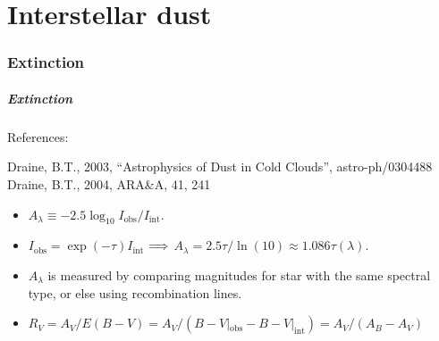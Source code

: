 
\addtocounter{part}{3}

\part{Interstellar dust}
\begin{frame}
  \partpage
  \tableofcontents[part=4]
\end{frame}

\section{Extinction}

\begin{frame}\frametitle{Extinction}


References: 

Draine, B.T., 2003, ``Astrophysics of Dust in Cold Clouds'',
astro-ph/0304488
Draine, B.T., 2004, ARA\&A, 41, 241


\begin{itemize}

\item $A_\lambda \equiv -2.5 \log_{10} I_\mathrm{obs} /
I_\mathrm{int}$. 

\item $I_\mathrm{obs} = \exp(-\tau)  I_\mathrm{int}$
${\bf \Longrightarrow}$ $A_\lambda = 2.5 \tau / \ln(10) \approx 1.086
\tau(\lambda)$. 

\item $A_\lambda$ is measured by comparing magnitudes  for star with
the same spectral type, or else using recombination lines. 





\item $R_V = A_V / E(B-V)   = A_V / (B-V|_\mathrm{obs} - B-V|_\mathrm{int}) = A_V / (A_B - A_V)$

\end{itemize}

\end{frame}

